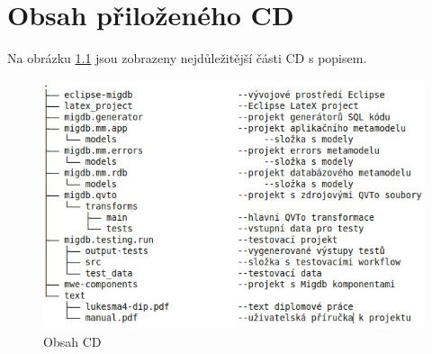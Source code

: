 \documentclass[11pt,twoside,a4paper]{book}
\begin{document}
\chapter{Obsah přiloženého CD}\label{chapt:obsah_cd}
Na obrázku \ref{fig:CD_content} jsou zobrazeny nejdůležitější části CD s
popisem.
\begin{figure}[H]
\begin{center}
\includegraphics[width=15cm]{figures/obsah_cd}
\caption{Obsah CD}
\label{fig:CD_content}
\end{center}
\end{figure}
\FloatBarrier

 

\end{document}
